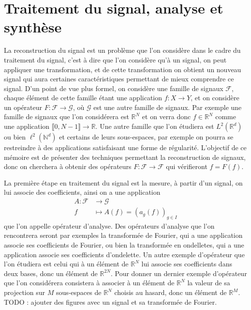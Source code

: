 \section{Traitement du signal, analyse et synthèse}
La reconstruction du signal est un problème que l'on considère dans le cadre du traitement du signal, c'est à dire que l'on considère qu'à un signal, on peut appliquer une transformation, et de cette transformation on obtient un nouveau signal qui aura certaines caractéristiques permettant de mieux comprendre ce signal.
D'un point de vue plus formel, on considère une famille de signaux $\mathcal{F}$, chaque élément de cette famille étant une application $f : X \longrightarrow Y$, et on considère un opérateur $F : \mathcal{F} \longrightarrow \mathcal{G}$, où $\mathcal{G}$ est une autre famille de signaux.
\newline
Par exemple une famille de signaux que l'on considérera est $\mathbb{R}^N$ et on verra donc $f\in \mathbb{R}^N$ comme une application $\llbracket 0,N-1 \rrbracket \rightarrow \mathbb{R}$.
Une autre famille que l'on étudiera est $L^2(\mathbb{R}^d)$ ou bien $\ell^2(\mathbb{N}^d)$ et certains de leurs sous-espaces, par exemple on pourra se restreindre à des applications satisfaisant une forme de régularité. 
\newline
L'objectif de ce mémoire est de présenter des techniques permettant la reconstruction de signaux, donc on cherchera à obtenir des opérateurs $F	:\mathcal{F} \rightarrow \mathcal{F}$ qui vérifieront $f=F(f)$. 

La première étape en traitement du signal est la mesure, à partir d'un signal, on lui associe des coefficients, ainsi on a une application
\begin{align}
	A : 	\mathcal{F} &\longrightarrow \mathcal{G} \\
		f &\longmapsto A(f) = (a_g(f))_{g\in I}
\end{align}
que l'on appelle opérateur d'analyse.
\newline
Des opérateurs d'analyse que l'on rencontrera seront par exemples la transformée de Fourier, qui a une application associe ses coefficients de Fourier, ou bien la transformée en ondelletes, qui a une application associe ses coefficients d'ondelette.
Un autre exemple d'opérateur que l'on étudiera est celui qui à un élément de $\mathbb{R}^N$ lui associe ses coefficients dans deux bases, donc un élément de $\mathbb{R}^{2N}$.
Pour donner un dernier exemple d'opérateur que l'on considérera consistera à associer à un élément de $\mathbb{R}^N$ la valeur de sa projection sur $M$ sous-espaces de $\mathbb{R}^N$ choisis au hasard, donc un élément de $\mathbb{R}^M$.
\newline 
TODO : ajouter des figures avec un signal et sa transformée de Fourier.

